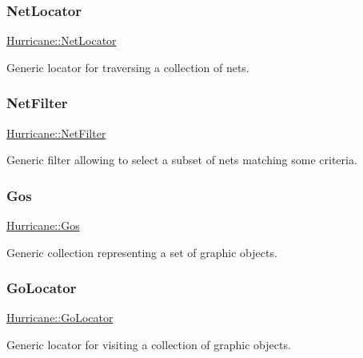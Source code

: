 \subsubsection{\texorpdfstring{Net\+Locator}{NetLocator}}
{\footnotesize\ttfamily \mbox{\hyperlink{namespaceHurricane_a2911512d442f8332c3cd3a135332cc02}{Hurricane\+::\+Net\+Locator}}}

Generic locator for traversing a collection of nets. \mbox{\label{namespaceHurricane_a0dfd2c5b40325a919d139091312732e9}} 
\subsubsection{\texorpdfstring{Net\+Filter}{NetFilter}}
{\footnotesize\ttfamily \mbox{\hyperlink{namespaceHurricane_a0dfd2c5b40325a919d139091312732e9}{Hurricane\+::\+Net\+Filter}}}

Generic filter allowing to select a subset of nets matching some criteria. \mbox{\label{namespaceHurricane_a4456a34f3bc6766d471c3064ace19759}} 
\subsubsection{\texorpdfstring{Gos}{Gos}}
{\footnotesize\ttfamily \mbox{\hyperlink{namespaceHurricane_a4456a34f3bc6766d471c3064ace19759}{Hurricane\+::\+Gos}}}

Generic collection representing a set of graphic objects. \mbox{\label{namespaceHurricane_ab7d66a25194b15d7646c93bcc1b15fc8}} 
\subsubsection{\texorpdfstring{Go\+Locator}{GoLocator}}
{\footnotesize\ttfamily \mbox{\hyperlink{namespaceHurricane_ab7d66a25194b15d7646c93bcc1b15fc8}{Hurricane\+::\+Go\+Locator}}}

Generic locator for visiting a collection of graphic objects. \mbox{\label{namespaceHurricane_a372aada7b76742fd900d0bb2c5398e0c}} 
